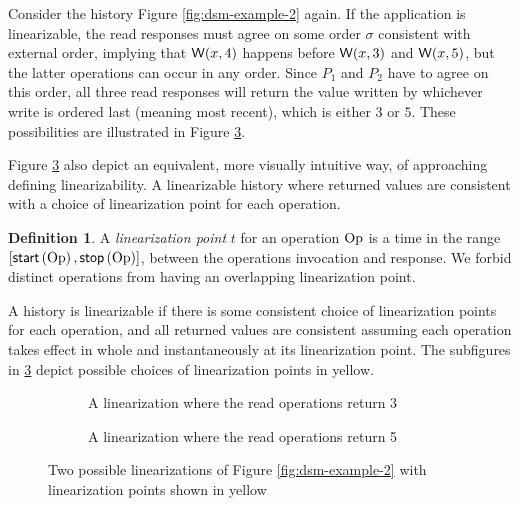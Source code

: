 \documentclass[]             %
{NASA}                       %
\theoremstyle{definition}
\newtheorem{definition}[theorem]{Definition}
\begin{document}
Consider the history Figure \ref{fig:dsm-example-2} again. If the
application is linearizable, the read responses must agree on some
order $\sigma$ consistent with external order, implying that
$\mathsf{W}\!\left(x, 4\right)$ happens before $\mathsf{W}\!\left(x, 3\right)$ and
$\mathsf{W}\!\left(x, 5\right)$, but the latter operations can occur in any
order. Since $P_1$ and $P_2$ have to agree on this order, all three
read responses will return the value written by whichever write is
ordered last (meaning most recent), which is either $3$ or $5$. These
possibilities are illustrated in Figure
\ref{fig:dsm-example-2-linearizations}.

Figure \ref{fig:dsm-example-2-linearizations} also depict an
equivalent, more visually intuitive way, of approaching defining
linearizability. A linearizable history where returned values are
consistent with a choice of linearization point for each operation.
\begin{definition}
  A \emph{linearization point} $t$ for an operation $\mathrm{Op}$ is a time in
  the range $[\mathsf{start}\left(\mathrm{Op}\right), \mathsf{stop}\left(\mathrm{Op}\right)]$, between the operations
  invocation and response. We forbid distinct operations from having
  an overlapping linearization point.
\end{definition}

A history is linearizable if there is some consistent choice of
linearization points for each operation, and all returned values are
consistent assuming each operation takes effect in whole and
instantaneously at its linearization point. The subfigures in
\ref{fig:dsm-example-2-linearizations} depict possible choices of
linearization points in yellow.

\begin{figure}
  \begin{subfigure}{1\textwidth}
    \setlength\belowcaptionskip{4ex}
    \centering
    
    \caption{A linearization where the read operations return 3}
    \label{fig:dsm-example-2-linearizations-1}
  \end{subfigure}
  \begin{subfigure}{1\textwidth}
    
        \caption{A linearization where the read operations return 5}
    \label{fig:dsm-example-2-linearizations-b}
  \end{subfigure}
  \caption{Two possible linearizations of Figure \ref{fig:dsm-example-2} with linearization points shown in yellow}
  \label{fig:dsm-example-2-linearizations}
\end{figure}
\end{document}
